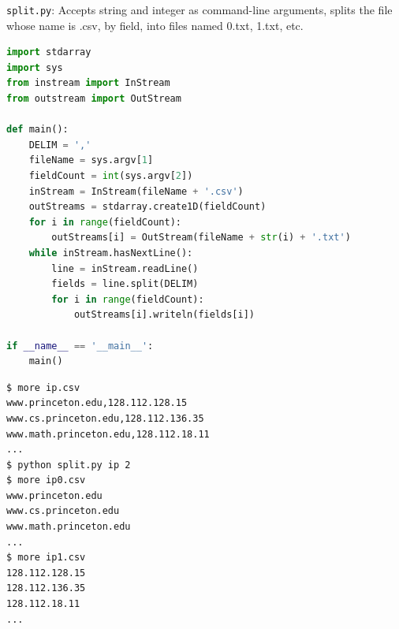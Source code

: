 \documentclass[8pt,a4paper,compress,handout]{beamer}
\begin{document}
\begin{frame}[fragile]
\begin{framed}
\tiny \lstinline{split.py}: Accepts string  and integer  as command-line arguments, splits the file whose name is .csv, by field, into  files named 0.txt, 1.txt, etc.
\end{framed}

\begin{lstlisting}[language=Python]
import stdarray
import sys
from instream import InStream
from outstream import OutStream

def main():
    DELIM = ','
    fileName = sys.argv[1]
    fieldCount = int(sys.argv[2])
    inStream = InStream(fileName + '.csv')
    outStreams = stdarray.create1D(fieldCount)
    for i in range(fieldCount):
        outStreams[i] = OutStream(fileName + str(i) + '.txt')
    while inStream.hasNextLine():
        line = inStream.readLine()
        fields = line.split(DELIM)
        for i in range(fieldCount):
            outStreams[i].writeln(fields[i])

if __name__ == '__main__':
    main()
\end{lstlisting}
\end{frame}

\begin{frame}[fragile]
\begin{lstlisting}[language={}]
$ more ip.csv 
www.princeton.edu,128.112.128.15
www.cs.princeton.edu,128.112.136.35
www.math.princeton.edu,128.112.18.11
...
$ python split.py ip 2
$ more ip0.csv
www.princeton.edu
www.cs.princeton.edu
www.math.princeton.edu
...
$ more ip1.csv
128.112.128.15
128.112.136.35
128.112.18.11
...
\end{lstlisting}
\end{frame}
\end{document}
